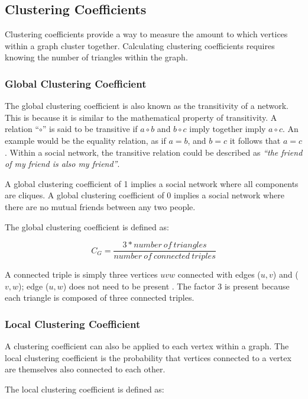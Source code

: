 \subsection{Clustering Coefficients}
Clustering coefficients provide a way to measure the amount to which vertices within a graph cluster together. Calculating clustering coefficients requires knowing the number of triangles within the graph.

\subsubsection{Global Clustering Coefficient}
The global clustering coefficient is also known as the transitivity of a network. This is because it is similar to the mathematical property of transitivity. A relation ``$\circ$'' is said to be transitive if $a \circ b$ and $b \circ c$ imply together imply $a \circ c$. An example would be the equality relation, as if $a = b$, and $b = c$ it follows that $a = c$ \cite{newman10}. Within a social network, the transitive relation could be described as \textit{``the friend of my friend is also my friend''}.

A global clustering coefficient of 1 implies a social network where all components are cliques. A global clustering coefficient of 0 implies a social network where there are no mutual friends between any two people.

The global clustering coefficient is defined as:

\begin{equation}
C_G = \frac{3 * number\: of\: triangles}{number\: of\: connected\: triples}
\label{eq:globalcc}
\end{equation}

A connected triple is simply three vertices $uvw$ connected with edges ($u, v$) and ($v, w$); edge ($u, w$) does not need to be present \cite{newman10}. The factor 3 is present because each triangle is composed of three connected triples.

\subsubsection{Local Clustering Coefficient}
A clustering coefficient can also be applied to each vertex within a graph. The local clustering coefficient is the probability that vertices connected to a vertex are themselves also connected to each other.

The local clustering coefficient is defined as:

